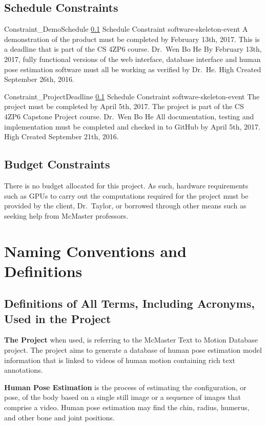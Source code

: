 \documentclass{scrreprt}
\begin{document}
\subsection{Schedule Constraints}
\label{req-schedule-constraint}

\requirement
{Constraint_DemoSchedule}
{\ref{req-schedule-constraint} Schedule Constraint }
{software-skeleton-event}
{A demonstration of the product must be completed by February 13th, 2017.}
{This is a deadline that is part of the CS 4ZP6 course.}
{Dr.\ Wen Bo He}
{By February 13th, 2017, fully functional versions of the web interface,
 database interface and human pose estimation software must all be working as
 verified by Dr.\ He.}
{High}
{Created September 26th, 2016.}

\requirement
{Constraint_ProjectDeadline}
{\ref{req-schedule-constraint} Schedule Constraint}
{software-skeleton-event}
{The project must be completed by April 5th, 2017.}
{The project is part of the CS 4ZP6 Capstone Project course.}
{Dr.\ Wen Bo He}
{All documentation, testing and implementation must be completed and checked in
 to GitHub by April 5th, 2017.}
{High}
{Created September 21th, 2016.}

\subsection{Budget Constraints}

There is no budget allocated for this project. As such, hardware requirements
such as GPUs to carry out the computations required for the project must be
provided by the client, Dr.\ Taylor, or borrowed through other means such as
seeking help from McMaster professors.

\section{Naming Conventions and Definitions}

\subsection{Definitions of All Terms, Including Acronyms, Used in the Project}

\textbf{The Project} when used, is referring to the McMaster Text to Motion
Database project. The project aims to generate a database of human pose
estimation model information that is linked to videos of human motion
containing rich text annotations.

\textbf{Human Pose Estimation} is the process of estimating the configuration,
or pose, of the body based on a single still image or a sequence of images that
comprise a video. Human pose estimation may find the chin, radius, humerus, and
other bone and joint positions.
\end{document}
